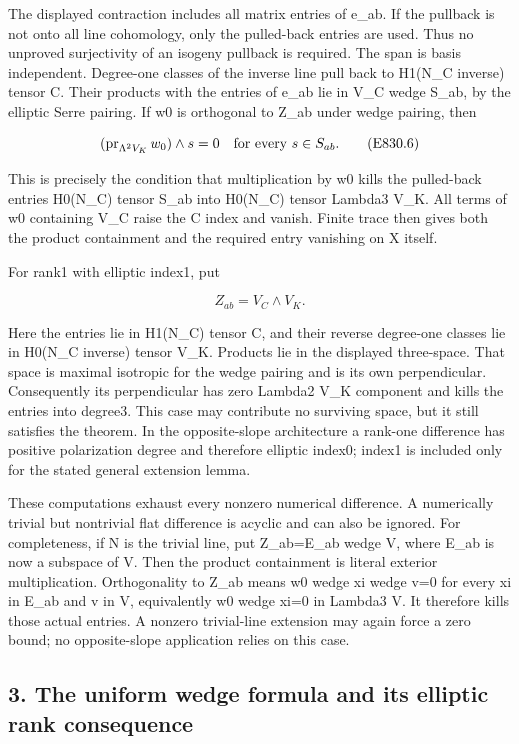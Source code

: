 The displayed contraction includes all matrix entries of e\_ab. If the
pullback is not onto all line cohomology, only the pulled-back entries are
used. Thus no unproved surjectivity of an isogeny pullback is required. The
span is basis independent. Degree-one classes of the inverse line pull back
to H1(N\_C inverse) tensor C. Their products with the entries of e\_ab lie
in V\_C wedge S\_ab, by the elliptic Serre pairing. If w0 is orthogonal to
Z\_ab under wedge pairing, then

\[
 (\operatorname{pr}_{\Lambda^2V_K} w_0)\wedge s=0
       \quad\hbox{for every }s\in S_{ab}.
 \tag{E830.6}
\]

This is precisely the condition that multiplication by w0 kills the
pulled-back entries H0(N\_C) tensor S\_ab into H0(N\_C) tensor Lambda3 V\_K.
All terms of w0 containing V\_C raise the C index and vanish. Finite trace
then gives both the product containment and the required entry vanishing on
X itself.

For rank1 with elliptic index1, put

\[
 Z_{ab}=V_C\wedge V_K.
 \tag{E830.7}
\]

Here the entries lie in H1(N\_C) tensor C, and their reverse degree-one
classes lie in H0(N\_C inverse) tensor V\_K. Products lie in the displayed
three-space. That space is maximal isotropic for the wedge pairing and is
its own perpendicular. Consequently its perpendicular has zero Lambda2 V\_K
component and kills the entries into degree3. This case may contribute no
surviving space, but it still satisfies the theorem. In the opposite-slope
architecture a rank-one difference has positive polarization degree and
therefore elliptic index0; index1 is included only for the stated general
extension lemma.

These computations exhaust every nonzero numerical difference. A numerically
trivial but nontrivial flat difference is acyclic and can also be ignored.
For completeness, if N is the trivial line, put Z\_ab=E\_ab wedge V, where
E\_ab is now a subspace of V. Then the product containment is literal
exterior multiplication. Orthogonality to Z\_ab means w0 wedge xi wedge v=0
for every xi in E\_ab and v in V, equivalently w0 wedge xi=0 in Lambda3 V.
It therefore kills those actual entries. A nonzero trivial-line extension
may again force a zero bound; no opposite-slope application relies on this
case.

\subsection{3. The uniform wedge formula and its elliptic rank
consequence}\label{SF-E830:the-uniform-wedge-formula-and-its-elliptic-rank-consequence}

